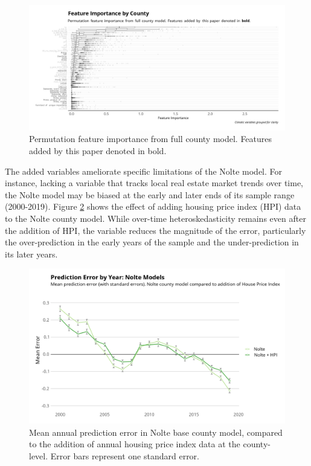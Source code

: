 \documentclass[12pt]{article}
\begin{document}
\begin{figure}
    \centering
    \includegraphics[width=1\textwidth]{exhibits/fcb_importance_all.png}
    \caption{Permutation feature importance from full county model. Features added by this paper denoted in bold.}
    \label{fig:fcb_importance}
\end{figure}

The added variables ameliorate specific limitations of the Nolte model. For instance, lacking a variable that tracks local real estate market trends over time, the Nolte model may be biased at the early and later ends of its sample range (2000-2019). Figure \ref{fig:nolte_resid_time} shows the effect of adding housing price index (HPI) data to the Nolte county model. While over-time heteroskedasticity remains even after the addition of HPI, the variable reduces the magnitude of the error, particularly the over-prediction in the early years of the sample and the under-prediction in its later years.

\begin{figure}
    \centering
    \includegraphics[width=1\textwidth]{exhibits/nolte_resid_time.png}
    \caption{Mean annual prediction error in Nolte base county model, compared to the addition of annual housing price index data at the county-level. Error bars represent one standard error.}
    \label{fig:nolte_resid_time}
\end{figure}
\end{document}
